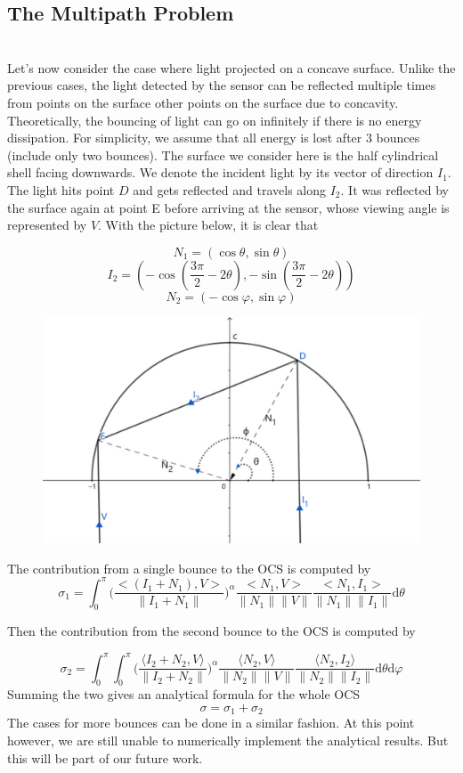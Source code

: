 \documentclass[11pt]{amsart}
\newcommand{\ip}[2]{\langle {#1}, {#2} \rangle}
\theoremstyle{definition}
\begin{document}
\subsection{The Multipath Problem}~\\
Let's now consider the case where light projected on a concave surface. Unlike the previous cases, the light detected by the sensor can be reflected multiple times from points on the surface other points on the surface due to concavity. Theoretically, the bouncing of light can go on infinitely if there is no energy dissipation. For simplicity, we assume that all energy is lost after 3 bounces (include only two bounces). The surface we consider here is the half cylindrical shell facing downwards. We denote the incident light by its vector of direction $I_1$. The light hits point $D$ and gets reflected and travels along $I_2$. It was reflected by the surface again at point E before arriving at the sensor, whose viewing angle is represented by $V$. With the picture below, it is clear that

$$N_1=(\cos\theta,\sin\theta)$$
$$I_2= (-\cos(\frac{3\pi}{2}-2\theta),-\sin(\frac{3\pi}{2}-2\theta))$$
$$N_2= (-\cos\varphi,\sin\varphi)$$

\begin{figure}[H]
  \includegraphics[width=4.5in]{./figs/multipath.pdf}
  \label{fig:reflection}
\end{figure}


The contribution from a single bounce to the OCS is computed by
$$\sigma_1 =\int_{0}^{\pi}\Bigg(\frac{<(I_1+N_1),V>}{\|I_1+N_1\|}\Bigg)^\alpha\frac{<N_1,V>}{\|N_1\| \|V\|}\frac{<N_1,I_1>}{\|N_1\| \|I_1\|} \mathrm{d}\theta$$

Then the contribution from the second bounce to the OCS is computed by

$$\sigma_2 =\int_{0}^{\pi}\int_{0}^{\pi}\Bigg(\frac{\ip{I_2+N_2}{V}}{\|I_2+N_2\|}\Bigg)^\alpha\frac{\ip{N_2}{V}}{\|N_2\| \|V\|}\frac{\ip{N_2}{I_2}}{\|N_2\| \|I_2\|}\mathrm{d}\theta\mathrm{d}\varphi$$
Summing the two gives an analytical formula for the whole OCS
 $$ \sigma= \sigma_1+\sigma_2$$
The cases for more bounces can be done in a similar fashion. At this point however, we are still unable to numerically implement the analytical results. But this will be part of our future work.
\end{document}
